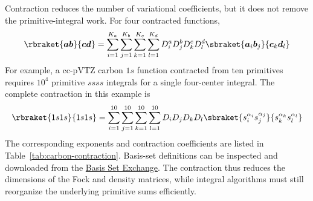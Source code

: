 \documentclass[11pt,a4paper,titlepage]{article}
\numberwithin{equation}{section}
\newcommand{\ba}{\boldsymbol{a}}
\newcommand{\bb}{\boldsymbol{b}}
\newcommand{\bc}{\boldsymbol{c}}
\newcommand{\bd}{\boldsymbol{d}}
\begin{document}
Contraction reduces the number of variational coefficients, but it does not
remove the primitive-integral work. For four contracted functions,
\begin{equation}
  \rbraket{\ba\bb}{\bc\bd}
  =\sum_{i=1}^{K_a}\sum_{j=1}^{K_b}\sum_{k=1}^{K_c}\sum_{l=1}^{K_d}
  D_i^aD_j^bD_k^cD_l^d
  \sbraket{\ba_i\bb_j}{\bc_k\bd_l}
\end{equation}
For example, a cc-pVTZ carbon $1s$ function contracted from ten primitives
requires $10^4$ primitive $ssss$ integrals for a single four-center integral.
The complete contraction in this example is
\begin{equation}
 \rbraket{1s1s}{1s1s}
 =\sum_{i=1}^{10}\sum_{j=1}^{10}\sum_{k=1}^{10}\sum_{l=1}^{10}
 D_iD_jD_kD_l
 \sbraket{s_i^{\alpha_i}s_j^{\alpha_j}}{s_k^{\alpha_k}s_l^{\alpha_l}}
\end{equation}
The corresponding exponents and contraction coefficients are listed in
Table~\ref{tab:carbon-contraction}.
Basis-set definitions can be inspected and downloaded from the
\href{https://www.basissetexchange.org}{Basis Set Exchange}.
The contraction thus reduces the dimensions of the Fock and density
matrices, while integral algorithms must still reorganize the underlying
primitive sums efficiently.
\end{document}
